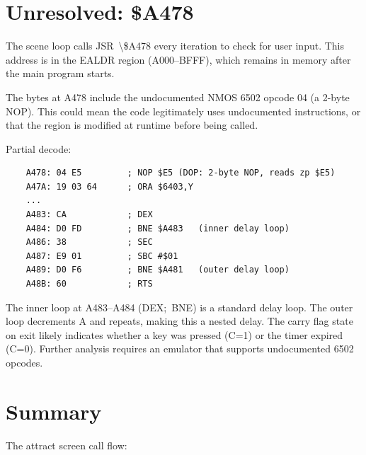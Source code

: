\documentclass[10pt]{report}
\begin{document}
\section{Unresolved: \$A478}
\label{sec:a478}

The scene loop calls {\Tt{}JSR\ {\textbackslash}{\$}A478\nwendquote} every iteration to check for user
input.  This address is in the EALDR region ({\Tt{}{\textbackslash}{\$}A000\nwendquote}--{\Tt{}{\textbackslash}{\$}BFFF\nwendquote}),
which remains in memory after the main program starts.

The bytes at {\Tt{}{\textbackslash}{\$}A478\nwendquote} include the undocumented NMOS 6502 opcode {\Tt{}{\textbackslash}{\$}04\nwendquote}
(a 2-byte NOP).  This could mean the code legitimately uses undocumented
instructions, or that the region is modified at runtime before being called.

Partial decode:

\begin{verbatim}
    A478: 04 E5         ; NOP $E5 (DOP: 2-byte NOP, reads zp $E5)
    A47A: 19 03 64      ; ORA $6403,Y
    ...
    A483: CA            ; DEX
    A484: D0 FD         ; BNE $A483   (inner delay loop)
    A486: 38            ; SEC
    A487: E9 01         ; SBC #$01
    A489: D0 F6         ; BNE $A481   (outer delay loop)
    A48B: 60            ; RTS
\end{verbatim}

The inner loop at {\Tt{}{\textbackslash}{\$}A483\nwendquote}--{\Tt{}{\textbackslash}{\$}A484\nwendquote} ({\Tt{}DEX;\ BNE\nwendquote}) is a standard
delay loop.  The outer loop decrements A and repeats, making this a
nested delay.  The carry flag state on exit likely indicates whether a
key was pressed (C=1) or the timer expired (C=0).  Further analysis
requires an emulator that supports undocumented 6502 opcodes.

\section{Summary}

The attract screen call flow:
\end{document}
